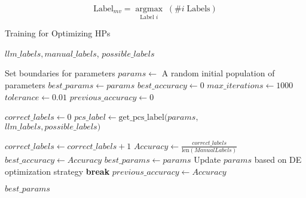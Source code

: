 \begin{equation}\label{eq:mv}
\text{Label}_{mv} = 
\underset{\text{Label } i}{\operatorname{argmax}} \; (\#i \; \text{Labels})
\end{equation}


\begin{algorithm}[h]
\caption{Training for Optimizing HPs}
\label{alg:pde}
\begin{algorithmic}[1]
\REQUIRE $llm\_labels, manual\_labels$, $possible\_labels$

\STATE Set boundaries for parameters
\STATE $params \gets$ A random initial population of parameters
\STATE $best\_params \gets params$
\STATE $best\_accuracy \gets 0$
\STATE $max\_iterations \gets 1000$
\STATE $tolerance \gets 0.01$
\STATE $previous\_accuracy \gets 0$


    \STATE $correct\_labels \gets 0$
    \STATE $pcs\_label \gets \text{get\_pcs\_label}(params, $ \\
         $llm\_labels, possible\_labels)$
        
            \STATE $correct\_labels \gets correct\_labels + 1$
        \ENDIF
    \ENDFOR
    \STATE $Accuracy \gets \frac{correct\_labels}{\text{len}(ManualLabels)}$
        \STATE $best\_accuracy \gets Accuracy$
        \STATE $best\_params \gets params$
    \ENDIF
    \STATE Update $params$ based on DE optimization strategy
        \STATE \textbf{break}
    \ENDIF
    \STATE $previous\_accuracy \gets Accuracy$

\ENDFOR

 $best\_params$
\end{algorithmic}
\end{algorithm}

